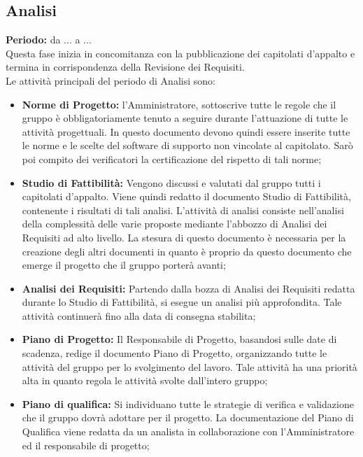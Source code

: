 	\subsection{Analisi}
	\textbf{Periodo:} da ... a ... \\
	Questa fase inizia in concomitanza con la pubblicazione dei capitolati d'appalto e termina in 		 corrispondenza della Revisione dei Requisiti. \\
	Le attività principali del periodo di Analisi sono: \\
	\begin{itemize}
		\item \textbf{Norme di Progetto:} l'Amministratore, sottoscrive tutte le regole che il gruppo è obbligatoriamente tenuto a seguire durante l'attuazione di tutte le attività progettuali. In questo documento devono quindi essere inserite tutte le norme e le scelte del software di supporto non vincolate al capitolato. Sarò poi compito dei verificatori la certificazione del rispetto di tali norme; \\
		\item \textbf{Studio di Fattibilità:} Vengono discussi e valutati dal gruppo tutti i capitolati d'appalto. Viene quindi redatto il documento Studio di Fattibilità, contenente i risultati di tali analisi. L'attività di analisi consiste nell'analisi della complessità delle varie proposte mediante l'abbozzo di Analisi dei Requisiti ad alto livello. La stesura di questo documento è necessaria per la creazione degli altri documenti in quanto è proprio da questo documento che emerge il progetto che il gruppo porterà avanti; \\
		\item \textbf{Analisi dei Requisiti:} Partendo dalla bozza di Analisi dei Requisiti redatta durante lo Studio di Fattibilità, si esegue un analisi più approfondita. Tale attività continuerà fino alla data di consegna stabilita; \\
		\item \textbf{Piano di Progetto:} Il Responsabile di Progetto, basandosi sulle date di scadenza, redige il documento Piano di Progetto, organizzando tutte le attività del gruppo per lo svolgimento del lavoro. Tale attività ha una priorità alta in quanto regola le attività svolte dall'intero gruppo; \\
		\item \textbf{Piano di qualifica:} Si individuano tutte le strategie di verifica e validazione che il gruppo dovrà adottare per il progetto. La documentazione del Piano di Qualifica viene redatta da un analista in collaborazione con l'Amministratore ed il responsabile di progetto; \\

\end{itemize}
